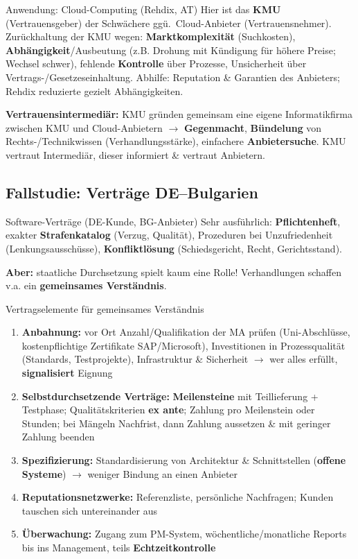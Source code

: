 \documentclass[a4paper, fontsize=7pt]{scrartcl}
\begin{document}
\begin{subbox}{Anwendung: Cloud-Computing (Rehdix, AT)}
Hier ist das \textbf{KMU} (Vertrauensgeber) der Schwächere ggü.\
Cloud-Anbieter (Vertrauensnehmer). Zurückhaltung der KMU wegen:
\textbf{Marktkomplexität} (Suchkosten), \textbf{Abhängigkeit}/Ausbeutung
(z.B. Drohung mit Kündigung für höhere Preise; Wechsel schwer),
fehlende \textbf{Kontrolle} über Prozesse, Unsicherheit über
Vertrags-/Gesetzeseinhaltung. Abhilfe: Reputation \& Garantien des
Anbieters; Rehdix reduzierte gezielt Abhängigkeiten.

\textbf{Vertrauensintermediär:} KMU gründen gemeinsam eine eigene
Informatikfirma zwischen KMU und Cloud-Anbietern $\to$
\textbf{Gegenmacht}, \textbf{Bündelung} von Rechts-/Technikwissen
(Verhandlungsstärke), einfachere \textbf{Anbietersuche}. KMU vertraut
Intermediär, dieser informiert \& vertraut Anbietern.
\end{subbox}

\subsection{Fallstudie: Verträge DE--Bulgarien}

\begin{mainbox}{Software-Verträge (DE-Kunde, BG-Anbieter)}
Sehr ausführlich: \textbf{Pflichtenheft}, exakter
\textbf{Strafenkatalog} (Verzug, Qualität), Prozeduren bei
Unzufriedenheit (Lenkungsausschüsse), \textbf{Konfliktlösung}
(Schiedsgericht, Recht, Gerichtsstand).

\textbf{Aber:} staatliche Durchsetzung spielt kaum eine Rolle!
Verhandlungen schaffen v.a. ein \textbf{gemeinsames Verständnis}.
\end{mainbox}

\begin{mainbox}{Vertragselemente für gemeinsames Verständnis}
\begin{enumerate}
    \item \textbf{Anbahnung:} vor Ort Anzahl/Qualifikation der MA prüfen
    (Uni-Abschlüsse, kostenpflichtige Zertifikate SAP/Microsoft),
    Investitionen in Prozessqualität (Standards, Testprojekte), Infrastruktur
    \& Sicherheit $\to$ wer alles erfüllt, \textbf{signalisiert} Eignung
    \item \textbf{Selbstdurchsetzende Verträge:} \textbf{Meilensteine} mit
    Teillieferung + Testphase; Qualitätskriterien \textbf{ex ante}; Zahlung
    pro Meilenstein oder Stunden; bei Mängeln Nachfrist, dann Zahlung
    aussetzen \& mit geringer Zahlung beenden
    \item \textbf{Spezifizierung:} Standardisierung von Architektur \&
    Schnittstellen (\textbf{offene Systeme}) $\to$ weniger Bindung an einen
    Anbieter
    \item \textbf{Reputationsnetzwerke:} Referenzliste, persönliche
    Nachfragen; Kunden tauschen sich untereinander aus
    \item \textbf{Überwachung:} Zugang zum PM-System, wöchentliche/monatliche
    Reports bis ins Management, teils \textbf{Echtzeitkontrolle}
\end{enumerate}
\end{mainbox}
\end{document}

